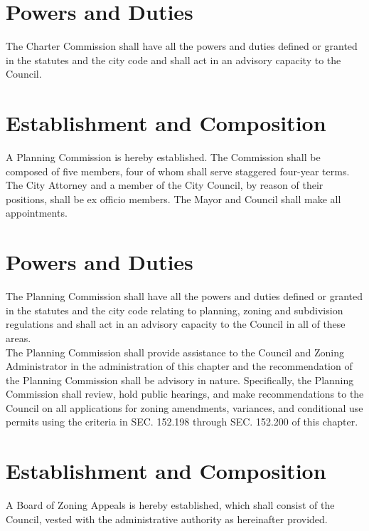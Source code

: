 \section{Powers and Duties}
The Charter Commission shall have all the powers and duties defined or granted in the statutes and the city code and shall act in an advisory capacity to the Council.\\

\setcounter{section}{119}
\section{Establishment and Composition}
A Planning Commission is hereby established.  The Commission shall be composed of five members, four of whom shall serve staggered four-year terms.  The City Attorney and a member of the City Council, by reason of their positions, shall be ex officio members.  The Mayor and Council shall make all appointments.

\section{Powers and Duties}
The Planning Commission shall have all the powers and duties defined or granted in the statutes and the city code relating to planning, zoning and subdivision regulations and shall act in an advisory capacity to the Council in all of these areas.\\
The Planning Commission shall provide assistance to the Council and Zoning Administrator in the administration of this chapter and the recommendation of the Planning Commission shall be advisory in nature. Specifically, the Planning Commission shall review, hold public hearings, and make recommendations to the Council on all applications for zoning amendments, variances, and conditional use permits using the criteria in SEC. 152.198 through SEC. 152.200 of this chapter.

\setcounter{section}{129}
\section{Establishment and Composition}
A Board of Zoning Appeals is hereby established, which shall consist of the Council, vested with the administrative authority as hereinafter provided.

